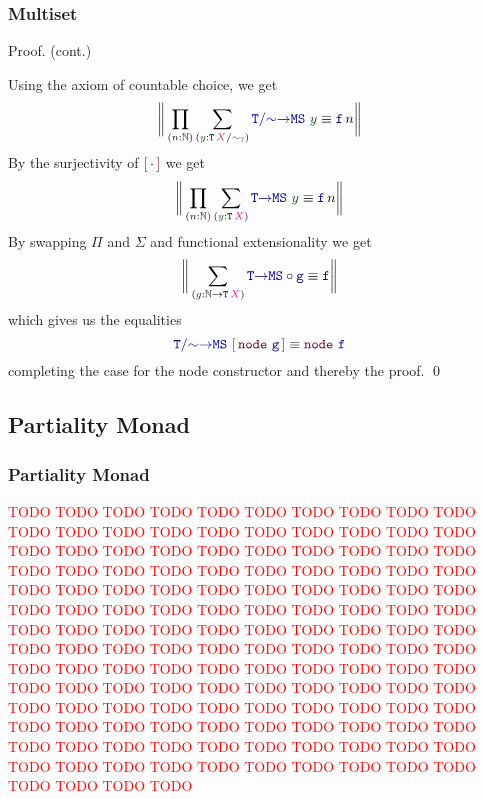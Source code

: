 \documentclass[xelatex,mathserif,serif,notheorems]{beamer} %
\theoremstyle{plain} %
\theoremstyle{definition}
\theoremstyle{remark}
\newcommand*{\term}[1]{\textcolor{green!30!black}{#1}} %
\newcommand*{\type}[1]{\textcolor{magenta!90!black}{#1}}
\newcommand*{\relation}[1]{\textcolor{gray!75!black}{\ensuremath{\mathtt{#1}}}}
\newcommand*{\function}[1]{\textcolor{blue!60!black}{\ensuremath{\mathtt{#1}}}}
\newcommand*{\constructor}[1]{\textcolor{purple!60!black}{\ensuremath{\mathtt{#1}}}}
\newcommand*{\typeformer}[1]{\ensuremath{\mathtt{#1}}}
\newcommand*{\quotientconstructor}[1]{\constructor{[}\,#1\,\constructor{]}}
\newcommand{\setlengths}{
  \setlength{\abovedisplayskip}{4pt}
  \setlength{\belowdisplayskip}{4pt}
  \setlength{\abovedisplayshortskip}{2pt}
  \setlength{\belowdisplayshortskip}{2pt}
}
\begin{document}
\begin{frame}
  \frametitle{Multiset}
  \begin{block}{Proof. (cont.)}\setlengths
    Using the axiom of countable choice, we get
    \begin{equation}
      \bigg\| \prod_{(n : \mathbb{N})} \sum_{(\term{y} : \typeformer{T}\,\type{X} / \relation{\sim_{T}})} \function{T/{\sim}{\rightarrow}MS}~\term{y} \equiv \function{f}\,n \bigg\|
    \end{equation}
    By the surjectivity of \(\quotientconstructor{{\cdot}}\) we get
    \begin{equation}
      \bigg\| \prod_{(n : \mathbb{N})} \sum_{(\term{y} : \typeformer{T}\,\type{X})} \function{T{\rightarrow}MS}~\term{y} \equiv \function{f}\,n \bigg\|
    \end{equation}
    By swapping \(\Pi\) and \(\Sigma\) and functional extensionality we get
    \begin{equation}
      \bigg\| \sum_{(\term{g} : \mathbb{N} \rightarrow \typeformer{T}\,\type{X})} \function{T{\rightarrow}MS} \circ \function{g} \equiv \function{f} \bigg\|
    \end{equation}
    which gives us the equalities
    \begin{equation}
      \function{T/{\sim}{\rightarrow}MS}~\quotientconstructor{\constructor{node}~\function{g}} \equiv \constructor{node}~\function{f}
    \end{equation}
    completing the case for the node constructor and thereby the proof. \qed
  \end{block}
\end{frame}

\subsection{Partiality Monad}
\begin{frame}
  \frametitle{Partiality Monad}
  \textcolor{red}{TODO TODO TODO TODO TODO TODO TODO TODO TODO TODO TODO TODO TODO TODO TODO TODO TODO TODO TODO TODO TODO TODO TODO TODO TODO TODO TODO TODO TODO TODO TODO TODO TODO TODO TODO TODO TODO TODO TODO TODO TODO TODO TODO TODO TODO TODO TODO TODO TODO TODO TODO TODO TODO TODO TODO TODO TODO TODO TODO TODO TODO TODO TODO TODO TODO TODO TODO TODO TODO TODO TODO TODO TODO TODO TODO TODO TODO TODO TODO TODO TODO TODO TODO TODO TODO TODO TODO TODO TODO TODO TODO TODO TODO TODO TODO TODO TODO TODO TODO TODO TODO TODO TODO TODO TODO TODO TODO TODO TODO TODO TODO TODO TODO TODO TODO TODO TODO TODO TODO TODO TODO TODO TODO TODO TODO TODO TODO TODO TODO TODO TODO TODO TODO TODO TODO TODO TODO TODO TODO TODO TODO TODO TODO TODO}
\end{frame}
\end{document}
